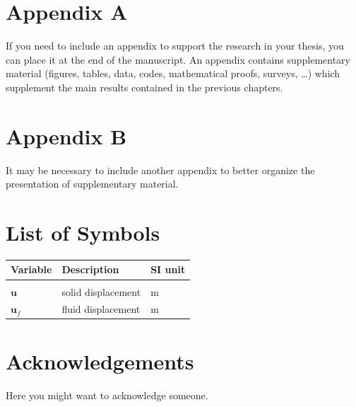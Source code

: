 \documentclass{Configuration_Files/PoliMi3i_thesis}
\begin{document}


\cleardoublepage
{} %
\appendix
\chapter{Appendix A}
If you need to include an appendix to support the research in your thesis, you can place it at the end of the manuscript.
An appendix contains supplementary material (figures, tables, data, codes, mathematical proofs, surveys, \dots)
which supplement the main results contained in the previous chapters.

\chapter{Appendix B}
It may be necessary to include another appendix to better organize the presentation of supplementary material.


\listoffigures

\listoftables

\chapter*{List of Symbols} %
\begin{table}[H]
    \centering
    \begin{tabular}{lll}
        \textbf{Variable} & \textbf{Description} & \textbf{SI unit} \\\hline\\[-9px]
        $\bm{u}$ & solid displacement & m \\[2px]
        $\bm{u}_f$ & fluid displacement & m \\[2px]
    \end{tabular}
\end{table}

\chapter*{Acknowledgements}
Here you might want to acknowledge someone.

\cleardoublepage
\end{document}
